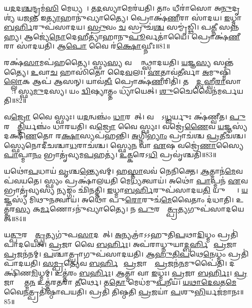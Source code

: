𑌯\ul{𑌦}𑌦\ul{𑌶𑍍𑌚}𑌨𑍍𑌦𑍍𑌰𑌮॑\ul{𑌸𑌿} 𑌮𑍇𑌧𑍍𑌯𑌮𑍍᳚।
𑌤\ul{𑌦}𑌸𑍍𑌯𑌾𑌮𑍇𑌰॑𑌯𑌤𑌿।
𑌤𑌾𑌂 𑌧𑍀𑌰𑌾॑𑌸𑍋 𑌅\ul{𑌨𑍁}𑌦𑍃𑌶𑍍𑌯॑ 𑌯𑌜\ul{𑌨𑍍𑌤} 𑌇\ul{𑌤𑍍𑌯𑌾}𑌹𑌾𑌨𑍁॑𑌖𑍍𑌯𑌾𑌤𑍍𑌯𑍈।
𑌪𑍍𑌰𑍋𑌕𑍍𑌷॑\ul{𑌣𑍀}𑌰𑌾 𑌸𑌾॑𑌦𑌯।
\ul{𑌇}𑌧𑍍𑌮𑌾\ul{𑌬}\ul{𑌰𑍍}\mbox{}𑌹𑌿𑌰𑍁𑌪॑𑌸𑌾𑌦𑌯।
\ul{𑌸𑍍𑌰𑍁}𑌵𑌂 \ul{𑌚} 𑌸𑍍𑌰𑍁𑌚॑\ul{𑌶𑍍𑌚} 𑌸𑌮𑍍𑌮𑍃॑𑌡𑍍𑌢𑌿।
𑌪\ul{𑌤𑍍𑌨𑍀}\ul{} 𑌸𑌨𑍍𑌨॑𑌹𑍍𑌯।
𑌆𑌜𑍍𑌯𑍇॑\ul{𑌨𑍋}𑌦𑍇𑌹𑍀𑌤𑍍𑌯𑌾॑𑌹𑌾𑌨𑍁\ul{𑌪𑍂}𑌰𑍍𑌵𑌤𑌾॑𑌯𑍈।
𑌪𑍍𑌰𑍋𑌕𑍍𑌷॑\ul{𑌣𑍀}𑌰𑌾 𑌸𑌾॑𑌦𑌯𑌤𑌿।
𑌆\ul{𑌪𑍋} 𑌵𑍈 𑌰॑\ul{𑌕𑍍𑌷𑍋}𑌘𑍍𑌨𑍀𑌃॥81॥

𑌰𑌕𑍍𑌷॑\ul{𑌸𑌾}𑌮𑌪॑𑌹𑌤𑍍𑌯𑍈।
𑌸𑍍𑌫𑍍𑌯\ul{𑌸𑍍𑌯} 𑌵𑌰𑍍𑌤𑍍𑌮᳚𑌨𑍍𑌥𑍍𑌸𑌾𑌦𑌯𑌤𑌿।
\ul{𑌯}𑌜𑍍𑌞\ul{𑌸𑍍𑌯} 𑌸𑌨𑍍𑌤॑𑌤𑍍𑌯𑍈।
\ul{𑌉}𑌵𑌾\ul{𑌚} 𑌹𑌾𑌸𑌿॑𑌤𑍋 𑌦𑍈\ul{𑌵}𑌲𑌃।
\ul{𑌏}𑌤𑌾𑌵॑\ul{𑌤𑍀}𑌰𑍍𑌵𑌾 \ul{𑌅}𑌮𑍁𑌷𑍍𑌮𑌿𑌁॑\ul{𑌲𑍍𑌲𑍋}𑌕 𑌆𑌪॑ 𑌆𑌸𑌨𑍍।
𑌯𑌾𑌵॑\ul{𑌤𑍀𑌃} 𑌪𑍍𑌰𑍋𑌕𑍍𑌷॑\ul{𑌣𑍀}𑌰𑌿𑌤𑌿॑।
𑌤𑌸𑍍𑌮𑌾᳚\ul{𑌦𑍍𑌬}𑌹𑍍𑌵𑍀\ul{𑌰𑌾}𑌸𑌾𑌦𑍍𑌯𑌾᳚:।
𑌸𑍍𑌫𑍍𑌯\ul{𑌮𑍁}𑌦𑌸𑍍𑌯\sn{}।
𑌯𑌂 \ul{𑌦𑍍𑌵𑌿}𑌷𑍍𑌯𑌾𑌤𑍍𑌤𑌂 𑌧𑍍𑌯𑌾॑𑌯𑍇𑌤𑍍।
\ul{𑌶𑍁}𑌚𑍈𑌵𑍈𑌨॑𑌮𑌰𑍍𑌪𑌯𑌤𑌿॥82॥

𑌵\ul{𑌜𑍍𑌰𑍋} 𑌵𑍈 𑌸𑍍𑌫𑍍𑌯𑌃।
𑌯\ul{𑌦}𑌨𑍍𑌵𑌞𑍍𑌚𑌂॑ \ul{𑌧𑌾}𑌰𑌯𑍇᳚𑌤𑍍।
𑌵𑌜𑍍𑌰𑍇᳚\-𑌽\ul{𑌧𑍍𑌵}𑌰𑍍𑌯𑍁𑌃 𑌕𑍍𑌷॑𑌣𑍍𑌵𑍀𑌤।
\ul{𑌪𑍁}𑌰𑌸𑍍𑌤𑌾᳚\ul{𑌤𑍍𑌤𑌿}𑌰𑍍𑌯𑌞𑍍𑌚𑌂॑ 𑌧𑌾𑌰𑌯𑌤𑌿।
𑌵\ul{𑌜𑍍𑌰𑍋} 𑌵𑍈 𑌸𑍍𑌫𑍍𑌯𑌃।
𑌵𑌜𑍍𑌰𑍇॑\ul{𑌣𑍈}𑌵 \ul{𑌯}𑌜𑍍𑌞𑌸𑍍𑌯॑ 𑌦𑌕𑍍𑌷𑌿\ul{𑌣}𑌤𑍋 𑌰\ul{𑌕𑍍𑌷𑌾}\ul{}𑌸𑍍𑌯𑌪॑𑌹𑌨𑍍𑌤𑌿।
\ul{𑌅}𑌗𑍍𑌨𑌿\ul{𑌭𑍍𑌯𑌾𑌂} 𑌪𑍍𑌰𑌾𑌚॑𑌶𑍍𑌚 \ul{𑌪𑍍𑌰}𑌤𑍀𑌚॑𑌶𑍍𑌚।
𑌸𑍍𑌫𑍍𑌯𑍇𑌨𑍋𑌦𑍀॑𑌚𑌶𑍍𑌚𑌾\ul{𑌧}𑌰𑌾𑌚॑𑌶𑍍𑌚।
𑌸𑍍𑌫𑍍𑌯𑍇\ul{𑌨} 𑌵𑌾 \ul{𑌏}𑌷 𑌵𑌜𑍍𑌰𑍇॑\ul{𑌣𑌾}𑌸𑍍𑌯𑍈 \ul{𑌪𑌾}𑌪𑍍𑌮𑌾\ul{𑌨𑌂} 𑌭𑍍𑌰𑌾𑌤𑍃॑𑌵𑍍𑌯𑌮\ul{𑌪}𑌹𑌤𑍍𑌯॑।
\ul{𑌉}\ul{𑌤𑍍𑌕}𑌰𑍇𑌽\ul{𑌧𑌿} 𑌪𑍍𑌰𑌵𑍃॑𑌶𑍍𑌚𑌤𑌿॥83॥

𑌯𑌥𑍋॑\ul{𑌪}𑌧𑌾𑌯॑ \ul{𑌵𑍃}𑌶𑍍𑌚\ul{𑌨𑍍𑌤𑍍𑌯𑍇}𑌵𑌮𑍍।
𑌹\ul{𑌸𑍍𑌤𑌾}𑌵𑌵॑ 𑌨𑍇𑌨𑌿𑌕𑍍𑌤𑍇।
\ul{𑌆}𑌤𑍍𑌮𑌾𑌨॑\ul{𑌮𑍇}𑌵 𑌪॑𑌵𑌯𑌤𑍇।
𑌸𑍍𑌫𑍍𑌯𑌂 𑌪𑍍𑌰𑌕𑍍𑌷𑌾॑𑌲𑌯𑌤𑌿 𑌮𑍇\ul{𑌧𑍍𑌯}𑌤𑍍𑌵𑌾𑌯॑।
𑌅𑌥𑍋॑ \ul{𑌪𑌾}𑌪𑍍𑌮𑌨॑ \ul{𑌏}𑌵 𑌭𑍍𑌰𑌾𑌤𑍃॑𑌵𑍍𑌯𑌸𑍍𑌯 \ul{𑌨𑍍𑌯}𑌙𑍍𑌗𑌂 𑌛𑌿॑𑌨𑌤𑍍𑌤𑌿।
\ul{𑌇}𑌧𑍍𑌮𑌾\ul{𑌬}\ul{𑌰𑍍}\mbox{}𑌹𑌿𑌰𑍁𑌪॑𑌸𑌾𑌦𑌯\ul{𑌤𑌿} 𑌯𑍁𑌕𑍍𑌤𑍍𑌯𑍈᳚।
\ul{𑌯}𑌜𑍍𑌞𑌸𑍍𑌯॑ 𑌮𑌿𑌥𑍁\ul{𑌨}𑌤𑍍𑌵𑌾𑌯॑।
𑌅𑌥𑍋॑ 𑌪𑍁\ul{𑌰𑍋}𑌰𑍁𑌚॑\ul{𑌮𑍇}𑌵𑍈𑌤𑌾𑌂 𑌦॑𑌧𑌾𑌤𑌿।
𑌉𑌤𑍍𑌤॑𑌰\ul{𑌸𑍍𑌯} 𑌕\ul{𑌰𑍍𑌮}𑌣𑍋\-𑌽𑌨𑍁॑𑌖𑍍𑌯𑌾𑌤𑍍𑌯𑍈।
𑌨 \ul{𑌪𑍁}𑌰𑌸𑍍𑌤𑌾᳚\ul{𑌤𑍍𑌪𑍍𑌰}𑌤𑍍𑌯𑌗𑍁𑌪॑𑌸𑌾𑌦𑌯𑍇𑌤𑍍॥84॥

𑌯\ul{𑌤𑍍𑌪𑍁}𑌰𑌸𑍍𑌤𑌾᳚\ul{𑌤𑍍𑌪𑍍𑌰}𑌤𑍍𑌯𑌗𑍁॑𑌪\ul{𑌸𑌾}𑌦𑌯𑍇᳚𑌤𑍍।
\ul{𑌅}𑌨𑍍𑌯𑌤𑍍𑌰𑌾॑𑌽𑌽𑌹𑍁𑌤𑌿\ul{𑌪}𑌥𑌾\ul{𑌦𑌿}𑌧𑍍𑌮𑌂 𑌪𑍍𑌰𑌤𑌿॑\-𑌪𑌾𑌦𑌯𑍇𑌤𑍍।
\ul{𑌪𑍍𑌰}𑌜𑌾 𑌵𑍈 \ul{𑌬}\ul{𑌰𑍍}𑌹𑌿𑌃।
𑌅𑌪॑𑌰𑌾𑌧𑍍𑌨𑍁𑌯𑌾\ul{𑌦𑍍𑌬}\ul{𑌰𑍍}𑌹𑌿𑌷𑌾᳚ \ul{𑌪𑍍𑌰}𑌜𑌾𑌨𑌾𑌂᳚ \ul{𑌪𑍍𑌰}𑌜𑌨॑𑌨𑌮𑍍।
\ul{𑌪}𑌶𑍍𑌚𑌾𑌤𑍍𑌪𑍍𑌰𑌾𑌗𑍁𑌪॑𑌸𑌾𑌦𑌯𑌤𑌿।
\ul{𑌆}\ul{𑌹𑍁}\ul{𑌤𑌿}\ul{𑌪}𑌥𑍇\ul{𑌨𑍇}𑌧𑍍𑌮𑌂 𑌪𑍍𑌰𑌤𑌿॑\-𑌪𑌾𑌦𑌯𑌤𑌿।
\ul{𑌸}\ul{𑌮𑍍𑌪𑍍𑌰}𑌤𑍍𑌯𑍇॑𑌵 \ul{𑌬}\ul{𑌰𑍍}𑌹𑌿𑌷𑌾᳚ \ul{𑌪𑍍𑌰}𑌜𑌾𑌨𑌾𑌂᳚ \ul{𑌪𑍍𑌰}𑌜𑌨॑\ul{𑌨}𑌮𑍁𑌪𑍈॑𑌤𑌿।
𑌦𑌕𑍍𑌷𑌿॑𑌣\ul{𑌮𑌿}𑌧𑍍𑌮𑌮𑍍।
𑌉𑌤𑍍𑌤॑𑌰𑌂 \ul{𑌬}\ul{𑌰𑍍}𑌹𑌿𑌃।
\ul{𑌆}𑌤𑍍𑌮𑌾 𑌵𑌾 \ul{𑌇}𑌧𑍍𑌮𑌃।
\ul{𑌪𑍍𑌰}𑌜𑌾 \ul{𑌬}\ul{𑌰𑍍}𑌹𑌿𑌃।
\ul{𑌪𑍍𑌰}𑌜𑌾 𑌹𑍍𑌯𑌾᳚𑌤𑍍𑌮\ul{𑌨} 𑌉𑌤𑍍𑌤॑𑌰𑌤𑌰𑌾 \ul{𑌤𑍀}𑌰𑍍𑌥𑍇।
𑌤\ul{𑌤𑍋} 𑌮𑍇𑌧॑𑌮𑍁\ul{𑌪}𑌨𑍀𑌯॑।
\ul{𑌯}\ul{𑌥𑌾}\ul{𑌦𑍇}\ul{𑌵}𑌤\ul{𑌮𑍇}𑌵𑍈\ul{𑌨}𑌤𑍍𑌪𑍍𑌰𑌤𑌿॑\-𑌷𑍍𑌠𑌾𑌪𑌯𑌤𑌿।
𑌪𑍍𑌰𑌤𑌿॑ 𑌤𑌿𑌷𑍍𑌠𑌤𑌿 \ul{𑌪𑍍𑌰}𑌜𑌯𑌾॑ \ul{𑌪}𑌶𑍁\ul{𑌭𑌿}𑌰𑍍𑌯𑌜॑𑌮𑌾𑌨𑌃॥85॥\anuvakamend[\ul{𑌵𑍃}\ul{𑌶𑍍𑌚}\ul{𑌤𑌿} \ul{𑌸𑌾}\ul{𑌦}\ul{𑌯𑍇}\ul{𑌦𑌿}𑌧𑍍𑌮𑌃 𑌪𑌞𑍍𑌚॑ 𑌚]




